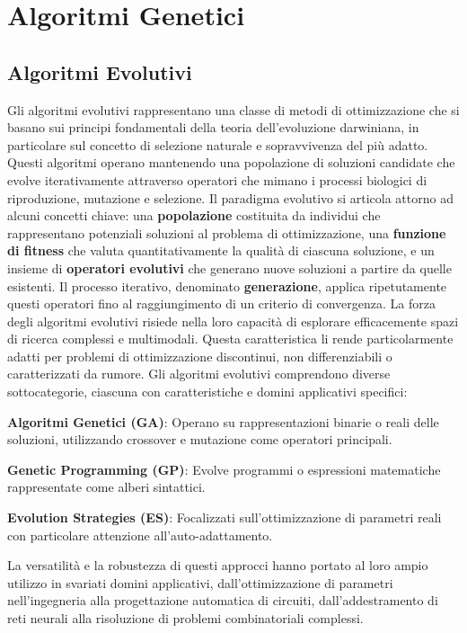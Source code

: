 \chapter{Algoritmi Genetici}

\section{Algoritmi Evolutivi}
Gli algoritmi evolutivi rappresentano una classe di metodi di ottimizzazione che si basano sui principi fondamentali della teoria dell'evoluzione darwiniana, in particolare sul concetto di selezione naturale e sopravvivenza del più adatto. Questi algoritmi operano mantenendo una popolazione di soluzioni candidate che evolve iterativamente attraverso operatori che mimano i processi biologici di riproduzione, mutazione e selezione.
Il paradigma evolutivo si articola attorno ad alcuni concetti chiave: una \textbf{popolazione} costituita da individui che rappresentano potenziali soluzioni al problema di ottimizzazione, una \textbf{funzione di fitness} che valuta quantitativamente la qualità di ciascuna soluzione, e un insieme di \textbf{operatori evolutivi} che generano nuove soluzioni a partire da quelle esistenti. Il processo iterativo, denominato \textbf{generazione}, applica ripetutamente questi operatori fino al raggiungimento di un criterio di convergenza.
La forza degli algoritmi evolutivi risiede nella loro capacità di esplorare efficacemente spazi di ricerca complessi e multimodali. Questa caratteristica li rende particolarmente adatti per problemi di ottimizzazione discontinui, non differenziabili o caratterizzati da rumore.
Gli algoritmi evolutivi comprendono diverse sottocategorie, ciascuna con caratteristiche e domini applicativi specifici:
\begin{compactitemize}
\item \textbf{Algoritmi Genetici (GA)}: Operano su rappresentazioni binarie o reali delle soluzioni, utilizzando crossover e mutazione come operatori principali.
\item \textbf{Genetic Programming (GP)}: Evolve programmi o espressioni matematiche rappresentate come alberi sintattici.
\item \textbf{Evolution Strategies (ES)}: Focalizzati sull'ottimizzazione di parametri reali con particolare attenzione all'auto-adattamento.
\end{compactitemize}
La versatilità e la robustezza di questi approcci hanno portato al loro ampio utilizzo in svariati domini applicativi, dall'ottimizzazione di parametri nell'ingegneria alla progettazione automatica di circuiti, dall'addestramento di reti neurali alla risoluzione di problemi combinatoriali complessi.


